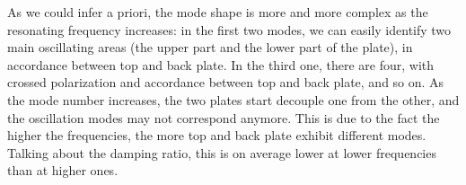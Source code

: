 \documentclass[a4paper,12pt,oneside]{article}
\begin{document}
As we could infer a priori, the mode shape is more and more complex as the resonating frequency increases: in the first two modes, we can easily identify two main oscillating areas (the upper part and the lower part of the plate), in accordance between top and back plate. In the third one, there are four, with crossed polarization and accordance between top and back plate, and so on. As the mode number increases, the two plates start decouple one from the other, and the oscillation modes may not correspond anymore. This is due to the fact the higher the frequencies, the more top and back plate exhibit different modes. Talking about the damping ratio, this is on average lower at lower frequencies than at higher ones.

\end{document}
